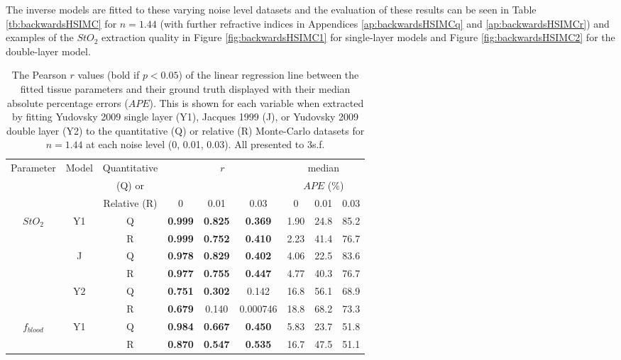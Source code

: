 The inverse models are fitted to these varying noise level datasets and the evaluation of these results can be seen in Table \ref{tb:backwardsHSIMC} for $n=1.44$ (with further refractive indices in Appendices \ref{ap:backwardsHSIMCq} and \ref{ap:backwardsHSIMCr}) and examples of the $StO_2$ extraction quality in Figure \ref{fig:backwardsHSIMC1} for single-layer models and Figure \ref{fig:backwardsHSIMC2} for the double-layer model. 

\begin{table}[h!]
    \centering
    \caption{The Pearson $r$ values (bold if $p<0.05$) of the linear regression line between the fitted tissue parameters and their ground truth displayed with their median absolute percentage errors ($APE$). This is shown for each variable when extracted by fitting Yudovsky 2009 single layer (Y1), Jacques 1999 (J), or Yudovsky 2009 double layer (Y2) to the quantitative (Q) or relative (R) Monte-Carlo datasets for $n=1.44$ at each noise level (0, 0.01, 0.03). All presented to 3s.f.}
    \begin{tabular}{|ccc|ccc|ccc|}
        \hline
        Parameter & Model & Quantitative & \multicolumn{3}{c}{$r$} & \multicolumn{3}{|c|}{median} \\
        & & (Q) or & \multicolumn{3}{c}{} & \multicolumn{3}{|c|}{$APE$ (\%)} \\
        & & Relative (R) & 0 & 0.01 & 0.03 & 0 & 0.01 & 0.03 \\
        \hline
        \multirow{6}{*}{$StO_2$} & \multirow{2}{*}{Y1} & Q & \textbf{0.999} & \textbf{0.825} & \textbf{0.369} & 1.90 & 24.8 & 85.2 \\
        & & R & \textbf{0.999} & \textbf{0.752} & \textbf{0.410} & 2.23 & 41.4 & 76.7 \\
        \cline{2-9}
        & \multirow{2}{*}{J} & Q & \textbf{0.978} & \textbf{0.829} & \textbf{0.402} & 4.06 & 22.5 & 83.6 \\
        & & R & \textbf{0.977} & \textbf{0.755} & \textbf{0.447} & 4.77 & 40.3 & 76.7 \\
        \cline{2-9}
        & \multirow{2}{*}{Y2} & Q & \textbf{0.751} & \textbf{0.302} & 0.142 & 16.8 & 56.1 & 68.9 \\
        & & R & \textbf{0.679} & 0.140 & 0.000746 & 18.8 & 68.2 & 73.3 \\
        \hline
        \multirow{6}{*}{$f_{blood}$} & \multirow{2}{*}{Y1} & Q & \textbf{0.984} & \textbf{0.667} & \textbf{0.450} & 5.83 & 23.7 & 51.8\\
        & & R & \textbf{0.870} & \textbf{0.547} & \textbf{0.535} & 16.7 & 47.5 & 51.1\\

\end{tabular}
\end{table}
